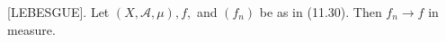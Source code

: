 [LEBESGUE]. Let $(X, \mathcal{A}, \mu), f,$ and $(f_n)$ be as in (11.30). Then $f_n \rightarrow f$ in measure.